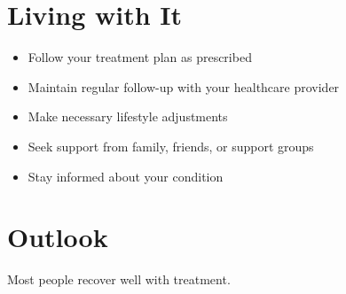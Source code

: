 \section{Living with It}
\begin{itemize}[noitemsep]
  \item Follow your treatment plan as prescribed
  \item Maintain regular follow-up with your healthcare provider
  \item Make necessary lifestyle adjustments
  \item Seek support from family, friends, or support groups
  \item Stay informed about your condition
\end{itemize}
\section{Outlook}
Most people recover well with treatment.
